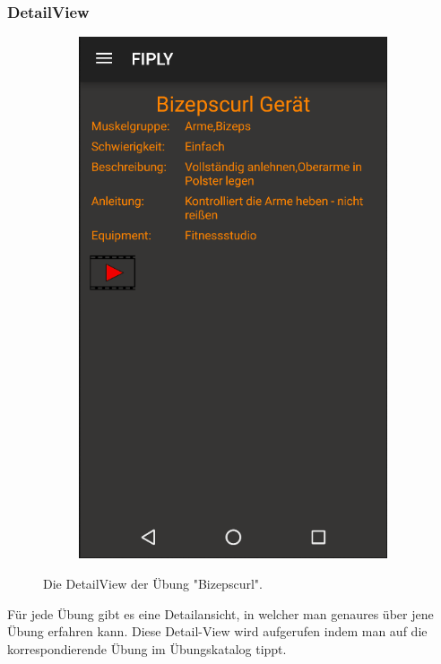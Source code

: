 \documentclass[FIPLY_base.tex]{subfiles}
\begin{document}
\subsubsection{DetailView}
\begin{figure}[H]
	\begin{subfigure}[b]{0.3\textwidth}
	\includegraphics[scale=0.55]{img/Uebungskatalog_detail}
	\end{subfigure}
	\hfil
	\caption{Die DetailView der Übung "Bizepscurl".}
\end{figure}



Für jede Übung gibt es eine Detailansicht, in welcher man genaures über jene Übung erfahren kann.
Diese Detail-View wird aufgerufen indem man auf die korrespondierende Übung im Übungskatalog tippt.
\end{document}
